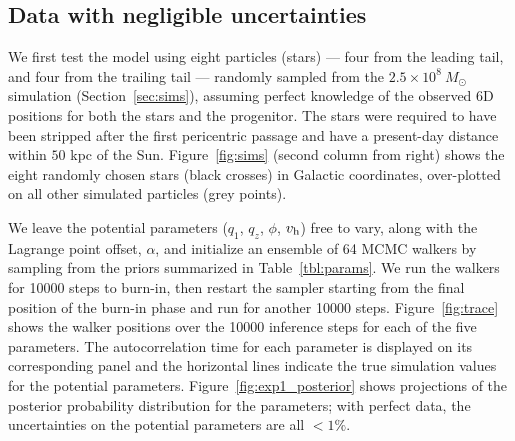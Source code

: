 \documentclass[letterpaper,12pt,preprint]{aastex}
\newcommand{\Loffset}{\alpha}
\newcommand{\vhalo}{v_{\rm h}}
\begin{document}
\subsection{Data with negligible uncertainties}

We first test the model using eight particles (stars) --- four from the leading tail, and four from the trailing tail --- randomly sampled from the $2.5\times10^8~M_\odot$ simulation (Section~\ref{sec:sims}), assuming perfect knowledge of the observed 6D positions for both the stars and the progenitor. The stars were required to have been stripped after the first pericentric passage and have a present-day distance within $50$ kpc of the Sun. Figure~\ref{fig:sims} (second column from right) shows the eight randomly chosen stars (black crosses) in Galactic coordinates, over-plotted on all other simulated particles (grey points). 

We leave the potential parameters ($q_1$, $q_z$, $\phi$, $\vhalo$) free to vary, along with the Lagrange point offset, $\Loffset$, and initialize an ensemble of 64 MCMC walkers by sampling from the priors summarized in Table~\ref{tbl:params}. We run the walkers for 10000 steps to burn-in, then restart the sampler starting from the final position of the burn-in phase and run for another 10000 steps. Figure~\ref{fig:trace} shows the walker positions over the 10000 inference steps for each of the five parameters. The autocorrelation time for each parameter is displayed on its corresponding panel and the horizontal lines indicate the true simulation values for the potential parameters. Figure~\ref{fig:exp1_posterior} shows projections of the posterior probability distribution for the parameters; with perfect data, the uncertainties on the potential parameters are all $<1\%$.

\begin{figure*}[!ht]
	\captionsetup[subfigure]{labelformat=empty}
        \centering
        
        
        \caption{TODO: mcmc trace plots}\label{fig:trace}
\end{figure*}
\end{document}
